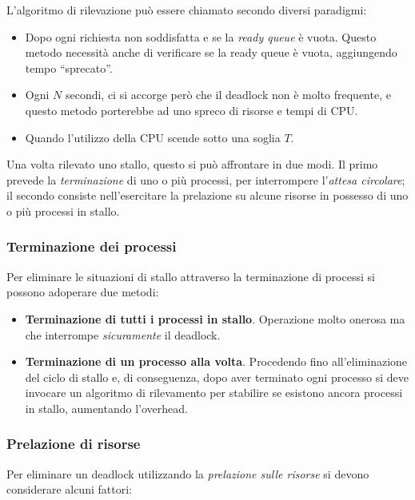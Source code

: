 \documentclass[a4paper,12pt, twoside]{report}
\begin{document}
L'algoritmo di rilevazione pu\`o essere chiamato secondo diversi paradigmi:
\begin{itemize}
\item Dopo ogni richiesta non soddisfatta e se la \emph{ready queue} \`e vuota. Questo metodo necessit\`a anche di verificare se la ready queue \`e vuota, aggiungendo tempo ``sprecato''.
\item Ogni $N$ secondi, ci si accorge per\`o che il deadlock non \`e molto frequente, e questo metodo porterebbe ad uno spreco di risorse e tempi di CPU.
\item Quando l'utilizzo della CPU scende sotto una soglia $T$.
\end{itemize}

Una volta rilevato uno stallo, questo si pu\`o affrontare in due modi. Il primo prevede la \emph{terminazione} di uno o pi\`u processi, per interrompere l'\emph{attesa circolare}; il secondo consiste nell'esercitare la prelazione su alcune risorse in possesso di uno o pi\`u processi in stallo.

\subsubsection{Terminazione dei processi}
Per eliminare le situazioni di stallo attraverso la terminazione di processi si possono adoperare due metodi:
\begin{itemize}
\item \textbf{Terminazione di tutti i processi in stallo}. Operazione molto onerosa ma che interrompe \emph{sicuramente} il deadlock.
\item \textbf{Terminazione di un processo alla volta}. Procedendo fino all'eliminazione del ciclo di stallo e, di conseguenza, dopo aver terminato ogni processo si deve invocare un algoritmo di rilevamento per stabilire se esistono ancora processi in stallo, aumentando l'overhead.
\end{itemize}


\subsubsection{Prelazione di risorse}

Per eliminare un deadlock utilizzando la \emph{prelazione sulle risorse} si devono considerare alcuni fattori:
\end{document}
